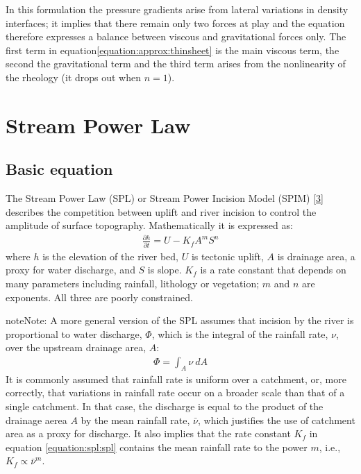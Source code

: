 \documentclass[letterpaper,10pt,english]{jupyterBook}
\begin{document}
\sphinxAtStartPar
In this formulation the pressure gradients arise from lateral variations in density interfaces; it implies that there remain only two forces at play and the equation therefore expresses a balance between viscous and gravitational forces only. The first term in equation\eqref{equation:approx:thinsheet} is the main viscous term, the second the gravitational term and the third term arises from the non\sphinxhyphen{}linearity of the rheology (it drops out when \(n=1\)).

\sphinxstepscope


\section{Stream Power Law}
\label{\detokenize{spl:stream-power-law}}\label{\detokenize{spl:spl-section}}\label{\detokenize{spl::doc}}

\subsection{Basic equation}
\label{\detokenize{spl:basic-equation}}
\sphinxAtStartPar
The Stream Power Law (SPL) or Stream Power Incision Model (SPIM) {[}\hyperlink{cite.references:id3}{3}{]} describes the competition between uplift and river incision to control the amplitude of surface topography. Mathematically it is expressed as:
\begin{equation}\label{equation:spl:spl}
\begin{split}\frac{\partial h}{\partial t}=U-K_fA^mS^n\end{split}
\end{equation}
\sphinxAtStartPar
where \(h\) is the elevation of the river bed, \(U\) is tectonic uplift, \(A\) is drainage area, a proxy for water discharge, and \(S\) is slope. \(K_f\) is a rate constant that depends on many parameters including rainfall, lithology or vegetation; \(m\) and \(n\) are exponents. All three are poorly constrained.

\begin{sphinxadmonition}{note}{Note:}
\sphinxAtStartPar
A more general version of the SPL assumes that incision by the river is proportional to water discharge, \(\Phi\), which is the integral of the rainfall rate, \(\nu\), over the upstream drainage area, \(A\):
\begin{equation*}
\begin{split}\Phi=\int_A\nu\ dA\end{split}
\end{equation*}
\sphinxAtStartPar
It is commonly assumed that rainfall rate is uniform over a catchment, or, more correctly, that variations in rainfall rate occur on a broader scale than that of a single catchment. In that case, the discharge is equal to the product of the drainage aerea \(A\) by the mean rainfall rate, \(\bar\nu\), which justifies the use of catchment area as a proxy for discharge. It also implies that the rate constant \(K_f\) in equation \eqref{equation:spl:spl} contains the mean rainfall rate to the power \(m\), i.e., \(K_f\propto\bar\nu^m\).
\end{sphinxadmonition}
\end{document}
